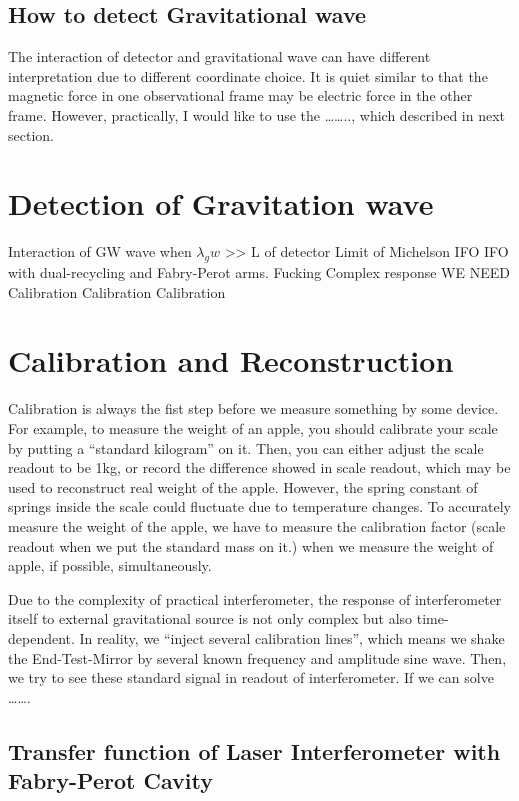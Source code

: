 \subsection{How to detect Gravitational wave}
The interaction of detector and gravitational wave can have different interpretation due to different coordinate choice. It is quiet similar to that the magnetic force in one observational frame may be electric force in the other frame. However, practically, I would like to use the …….., which described in next section.


\section{Detection of Gravitation wave}

Interaction of GW wave when $\lambda_gw$ >> L of detector
Limit of Michelson IFO
IFO with dual-recycling and Fabry-Perot  arms.
Fucking Complex response
WE NEED Calibration Calibration Calibration



\section{Calibration and Reconstruction}

Calibration is always the fist step before we measure something by some device.
For example, to measure the weight of an apple, you should calibrate your scale by putting a “standard kilogram” on it. Then, you can either adjust the scale readout to be 1kg, or record the difference showed in scale readout, which may be used to reconstruct real weight of the apple. However, the spring constant of springs inside the scale could fluctuate due to temperature changes. To accurately measure the weight of the apple, we have to measure the calibration factor (scale readout when we put the standard mass on it.) when we measure the weight of apple, if possible, simultaneously.

Due to the complexity of practical interferometer, the response of interferometer itself to external gravitational source is not only complex but also time-dependent. In reality, we “inject several calibration lines”, which means we shake the End-Test-Mirror by several known frequency and amplitude sine wave. Then, we try to see these standard signal in readout of interferometer. If we can solve 
……. 


\subsection{Transfer function of Laser Interferometer with Fabry-Perot Cavity}
